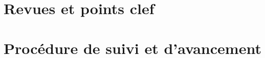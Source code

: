\documentclass{../../res/univ-projet}
\begin{document}
\section{Revues et points clef}

\section{Procédure de suivi et d'avancement}
\end{document}
